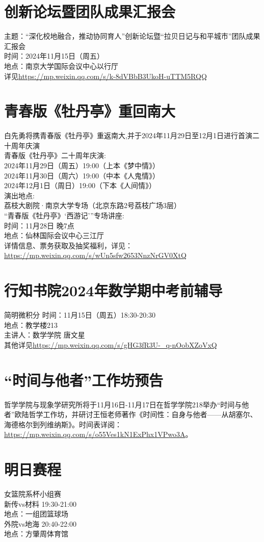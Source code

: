 \documentclass[letterpaper, 12pt]{article}
\begin{document}
\begin{multicols}{2}
\section{创新论坛暨团队成果汇报会}
主题：“深化校地融合，推动协同育人”创新论坛暨“拉贝日记与和平城市”团队成果汇报会\\
时间：2024年11月15日（周五）\\
地点：南京大学国际会议中心以行厅\\
详见\url{https://mp.weixin.qq.com/s/k-8dVBbB3UkoH-uTTM5RQQ}
\section{青春版《牡丹亭》重回南大}
白先勇将携青春版《牡丹亭》重返南大,并于2024年11月29日至12月1日进行首演二十周年庆演\\
青春版《牡丹亭》二十周年庆演:\\
2024年11月29日（周五）19:00（上本《梦中情》）\\
2024年11月30日（周六）19:00（中本《人鬼情》）\\
2024年12月1日（周日）19:00（下本《人间情》）\\
演出地点:\\
荔枝大剧院·南京大学专场（北京东路2号荔枝广场3层）\\
“青春版《牡丹亭》‘西游记’”专场讲座:\\
时间：11月28日 晚7点\\
地点：仙林国际会议中心三江厅\\
详情信息、票务获取及抽奖福利，详见：\url{https://mp.weixin.qq.com/s/wUn5sfw2653NnzNrGV0XtQ}
\section{行知书院2024年数学期中考前辅导}
简明微积分
时间：11月15日（周五）18:30-20:30\\
地点：教学楼213\\
主讲人：数学学院 唐文星\\
其他详见\url{https://mp.weixin.qq.com/s/gHG3fR3U-_q-nOobXZoVxQ}
\section{“时间与他者”工作坊预告}
哲学学院与现象学研究所将于11月16日-11月17日在哲学学院218举办“时间与他者”欧陆哲学工作坊，并研讨王恒老师著作《时间性：自身与他者——从胡塞尔、海德格尔到列维纳斯》。时间表详阅：\url{https://mp.weixin.qq.com/s/o55Ves1kN1ExPhx1VPwo3A}。
\section{明日赛程}
女篮院系杯小组赛\\
新传vs材料 19:30-21:00\\
地点：一组团篮球场\\
外院vs地海 20:40-22:00\\
地点：方肇周体育馆
\end{multicols} 
\end{document}
